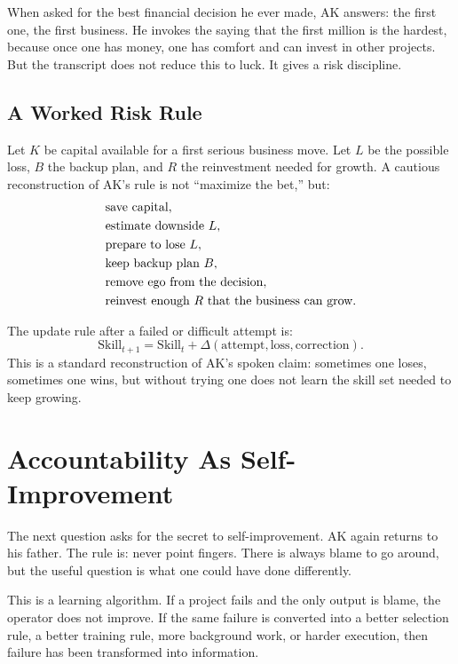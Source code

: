 When asked for the best financial decision he ever made, AK answers: the first one, the first business. He invokes the saying that the first million is the hardest, because once one has money, one has comfort and can invest in other projects. But the transcript does not reduce this to luck. It gives a risk discipline.

\subsection{A Worked Risk Rule}

Let \(K\) be capital available for a first serious business move. Let \(L\) be the possible loss, \(B\) the backup plan, and \(R\) the reinvestment needed for growth. A cautious reconstruction of AK's rule is not ``maximize the bet,'' but:
\begin{align}
&\hbox{save capital},\\
&\hbox{estimate downside } L,\\
&\hbox{prepare to lose } L,\\
&\hbox{keep backup plan } B,\\
&\hbox{remove ego from the decision},\\
&\hbox{reinvest enough } R \hbox{ that the business can grow.}
\end{align}

The update rule after a failed or difficult attempt is:
\begin{equation}
\mathrm{Skill}_{t+1}
=
\mathrm{Skill}_{t}
+
\Delta(\mathrm{attempt},\mathrm{loss},\mathrm{correction}).
\end{equation}
This is a standard reconstruction of AK's spoken claim: sometimes one loses, sometimes one wins, but without trying one does not learn the skill set needed to keep growing.

\section{Accountability As Self-Improvement}

The next question asks for the secret to self-improvement. AK again returns to his father. The rule is: never point fingers. There is always blame to go around, but the useful question is what one could have done differently.

This is a learning algorithm. If a project fails and the only output is blame, the operator does not improve. If the same failure is converted into a better selection rule, a better training rule, more background work, or harder execution, then failure has been transformed into information.

